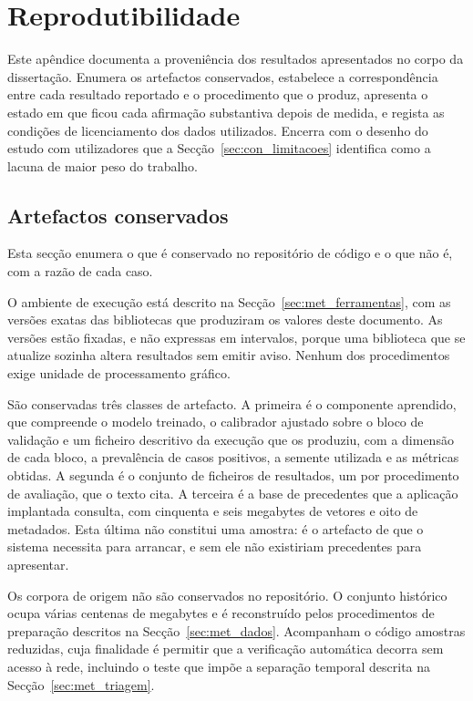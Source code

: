 \chapter{Reprodutibilidade}
\label{ap:reprodutibilidade}

Este apêndice documenta a proveniência dos resultados apresentados no corpo da dissertação. Enumera
os artefactos conservados, estabelece a correspondência entre cada resultado reportado e o
procedimento que o produz, apresenta o estado em que ficou cada afirmação substantiva depois de
medida, e regista as condições de licenciamento dos dados utilizados. Encerra com o desenho do
estudo com utilizadores que a Secção~\ref{sec:con_limitacoes} identifica como a lacuna de maior
peso do trabalho.

\section{Artefactos conservados}
\label{sec:ap_artefactos}

Esta secção enumera o que é conservado no repositório de código e o que não é, com a razão de cada
caso.

O ambiente de execução está descrito na Secção~\ref{sec:met_ferramentas}, com as versões exatas das
bibliotecas que produziram os valores deste documento. As versões estão fixadas, e não expressas em
intervalos, porque uma biblioteca que se atualize sozinha altera resultados sem emitir aviso.
Nenhum dos procedimentos exige unidade de processamento gráfico.

São conservadas três classes de artefacto. A primeira é o componente aprendido, que compreende o
modelo treinado, o calibrador ajustado sobre o bloco de validação e um ficheiro descritivo da
execução que os produziu, com a dimensão de cada bloco, a prevalência de casos positivos, a semente
utilizada e as métricas obtidas. A segunda é o conjunto de ficheiros de resultados, um por
procedimento de avaliação, que o texto cita. A terceira é a base de precedentes que a aplicação
implantada consulta, com cinquenta e seis megabytes de vetores e oito de metadados. Esta última não
constitui uma amostra: é o artefacto de que o sistema necessita para arrancar, e sem ele não
existiriam precedentes para apresentar.

Os corpora de origem não são conservados no repositório. O conjunto histórico ocupa várias centenas
de megabytes e é reconstruído pelos procedimentos de preparação descritos na
Secção~\ref{sec:met_dados}. Acompanham o código amostras reduzidas, cuja finalidade é permitir que a
verificação automática decorra sem acesso à rede, incluindo o teste que impõe a separação temporal
descrita na Secção~\ref{sec:met_triagem}.

